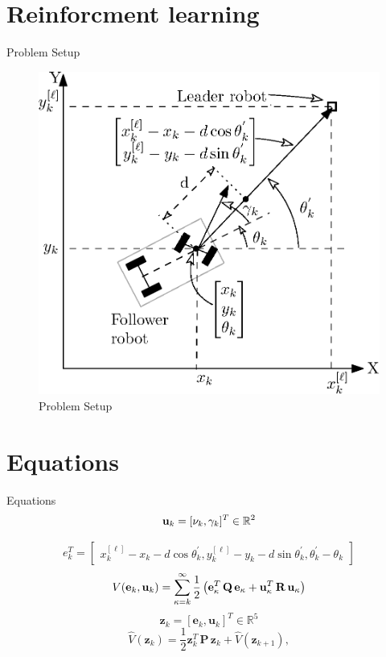 \documentclass{beamer}
\begin{document}
\section{Reinforcment learning}
\begin{frame}{Problem Setup}

\begin{figure}
\includegraphics[scale=0.5]{figs/ipe/LF-Setup.eps}
\caption{Problem Setup}
\end{figure}

\end{frame}

\section{Equations}
\begin{frame}{Equations}
\begin{equation}
{\bf u}_k=[\nu_k,\gamma_k]^T\in\mathbb{R}^2
\end{equation}

\begin{equation}
{e}_k^T = 
\begin{bmatrix}
x_k^{[\ell]} - x_k - d\cos\theta_k^{'},
y_k^{[\ell]} - y_k - d\sin\theta_k^{'},
\theta_k^{'} - \theta_k
\end{bmatrix}
\end{equation}
\begin{equation}
V({\bf e}_k,{\bf u}_k) = \sum_{\kappa=k}^\infty \frac{1}{2}\left({\bf e}_\kappa^T\, {\bf Q}\, {\bf e}_\kappa + {\bf u}_\kappa^T \, {\bf R}\, {\bf u_\kappa}\right)
\end{equation}
\begin{equation}
\mathbf{z}_k = \left[\mathbf{e}_k ,\mathbf{u}_k\right]^T\in\mathbb{R}^5
\end{equation}
\begin{equation}
\hat{V}(\mathbf{z}_k) = \frac{1}{2}\mathbf{z}_k^T\, {\mathbf{P}}\, \mathbf{z}_k + \hat{V}(\mathbf{z}_{k+1}),
\end{equation}
\end{frame}
\end{document}
